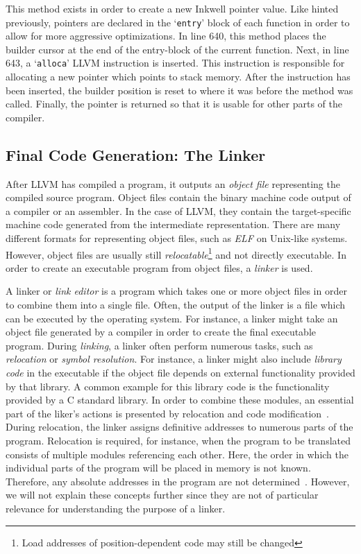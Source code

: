 This method exists in order to create a new Inkwell pointer value.
Like hinted previously, pointers are declared in the `\texttt{entry}' block of each function in order to allow for more aggressive optimizations.
In line 640, this method places the builder cursor at the end of the entry-block of the current function.
Next, in line 643, a `\texttt{alloca}' LLVM instruction is inserted.
This instruction is responsible for allocating a new pointer which points to stack memory.
After the instruction has been inserted, the builder position is reset to where it was before the method was called.
Finally, the pointer is returned so that it is usable for other parts of the compiler.

\subsection{Final Code Generation: The Linker}\label{sec:linker}

After LLVM has compiled a program, it outputs an \emph{object file} representing the compiled source program.
Object files contain the binary machine code output of a compiler or an assembler.
In the case of LLVM, they contain the target-specific machine code generated from the intermediate representation.
There are many different formats for representing object files, such as \emph{ELF} on Unix-like systems.
However, object files are usually still \emph{relocatable}\footnote{Load addresses of position-dependent code may still be changed} and not directly executable.
In order to create an executable program from object files, a \emph{linker} is used.

A linker or \emph{link editor} is a program which takes one or more object files in order to combine them into a single file.
Often, the output of the linker is a file which can be executed by the operating system.
For instance, a linker might take an object file generated by a compiler in order to create the final executable program.
During \emph{linking}, a linker often perform numerous tasks, such as \emph{relocation} or \emph{symbol resolution}.
For instance, a linker might also include \emph{library code} in the executable if the object file depends on external functionality provided by that library.
A common example for this library code is the functionality provided by a C standard library.
In order to combine these modules, an essential part of the liker's actions is presented by relocation and code modification~\cite[pp.~1-15]{Levine2000}.
During relocation, the linker assigns definitive addresses to numerous parts of the program.
Relocation is required, for instance, when the program to be translated consists of multiple modules referencing each other.
Here, the order in which the individual parts of the program will be placed in memory is not known.
Therefore, any absolute addresses in the program are not determined~\cite[p.~74]{Zhirkov2017-wk}.
However, we will not explain these concepts further since they are not of particular relevance for understanding the purpose of a linker.

